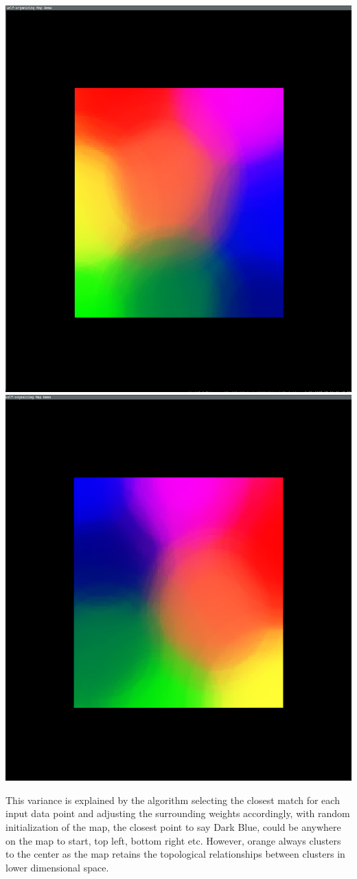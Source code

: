 \documentclass[11pt]{article}
\begin{document}
\begin{center}
\includegraphics[scale=.15]{output1}\includegraphics[scale=.1505]{output2}
\end{center}
This variance is explained by the algorithm selecting the closest match for each input data point and adjusting the surrounding weights accordingly, with random initialization of the map, the closest point to say Dark Blue, could be anywhere on the map to start, top left, bottom right etc. However, orange always clusters to the center as the map retains the topological relationships between clusters in lower dimensional space.
\end{document}
